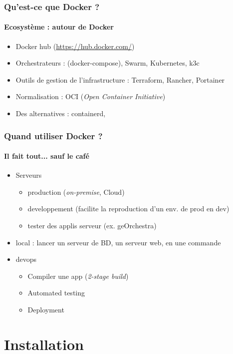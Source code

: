 \documentclass[11pt]{beamer}
\begin{document}
\begin{frame}
\frametitle{Qu'est-ce que Docker ?}
\framesubtitle{Ecosystème : autour de Docker}
\begin{itemize}
	\item Docker hub (\url{https://hub.docker.com/})
	\item Orchestrateurs : (docker-compose), Swarm, Kubernetes, k3c
	\item Outils de gestion de l'infrastructure : Terraform, Rancher, Portainer
	\item Normalisation : OCI (\textit{Open Container Initiative})
	\item Des alternatives : containerd, 
\end{itemize}
\end{frame}

\begin{frame}
\frametitle{Quand utiliser Docker ?}
\framesubtitle{Il fait tout... sauf le café}
\begin{itemize}
	\item Serveurs
	\begin{itemize}
		\item production (\textit{on-premise}, Cloud)
		\item developpement (facilite la reproduction d'un env. de prod en dev)
		\item tester des applis serveur (ex. geOrchestra)
	\end{itemize}
	\item local : lancer un serveur de BD, un serveur web, en une commande
	\item devops
	\begin{itemize}
		\item Compiler une app (\textit{2-stage build})
		\item Automated testing
		\item Deployment
	\end{itemize}
\end{itemize}
\end{frame}

\section{Installation}
\end{document}
